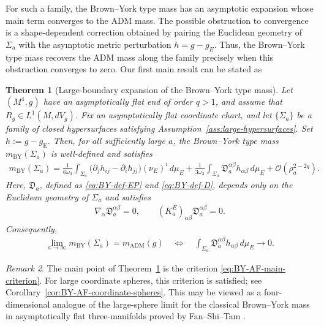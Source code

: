 \documentclass[10pt]{amsart}
\newcommand{\gE}{g_{\mathrm{E}}}
\newcommand{\ADM}{\mathrm{ADM}}
\newcommand{\BY}{\mathrm{BY}}
\theoremstyle{plain}
\newtheorem{theorem}{Theorem}[section]
\theoremstyle{remark}
\newtheorem{remark}[theorem]{Remark}
\begin{document}
	For such a family, the Brown--York type mass has an asymptotic expansion whose main term converges to the ADM mass. The possible obstruction to convergence is a shape-dependent correction obtained by pairing the Euclidean geometry of $\Sigma_a$ with the asymptotic metric perturbation $h=g-g_E$. Thus, the Brown--York type mass recovers the ADM mass along the family precisely when this obstruction converges to zero. Our first main result can be stated as
	
	\begin{theorem}[Large-boundary expansion of the Brown--York type mass]
		\label{thm:BY-AF-large-boundary}
		Let $(M^4,g)$ have an asymptotically flat end of order $q>1$, and assume that
		$R_g\in L^1(M,dV_g)$. Fix an asymptotically flat coordinate chart, and let
		$\{\Sigma_a\}$ be a family of closed hypersurfaces satisfying
		Assumption~\ref{ass:large-hypersurfaces}. Set $h:=g-\gE$. Then, for all sufficiently large $a$, the Brown--York type mass
		$m_{\BY}(\Sigma_a)$ is well-defined and satisfies
		\begin{align}\label{eq:BY-AF-main-expansion}
			m_{\BY}(\Sigma_a)
			=
			\frac{1}{6\omega_3}
			\int_{\Sigma_a}
			\bigl(
			\partial_jh_{ij}
			-
			\partial_ih_{jj}
			\bigr)(\nu_E)^i\,d\mu_E
			+
			\frac{1}{3\omega_3}\int_{\Sigma_a}
			\mathfrak D_a^{\alpha\beta}
			h_{\alpha\beta}\,d\mu_E
			+
			\mathcal O(\rho_a^{2-2q}).
		\end{align}
		Here, $\mathfrak D_a$, defined as \eqref{eq:BY-def-EP} and \eqref{eq:BY-def-D}, depends only on the Euclidean geometry of $\Sigma_a$ and satisfies
		\begin{align*}
			\nabla_\alpha\mathfrak D_a^{\alpha\beta}=0,
			\qquad
			(K_a^E)_{\alpha\beta}\mathfrak D_a^{\alpha\beta}=0.
		\end{align*}
		Consequently,
		\begin{align}\label{eq:BY-AF-main-criterion}
			\lim_{a\to\infty}m_{\BY}(\Sigma_a)
			=
			m_{\ADM}(g)
			\quad\Longleftrightarrow\quad
			\int_{\Sigma_a}
			\mathfrak D_a^{\alpha\beta}
			h_{\alpha\beta}\,d\mu_E
			\longrightarrow 0.
		\end{align}
	\end{theorem}
	
	\begin{remark}
		The main point of Theorem~\ref{thm:BY-AF-large-boundary} is the
		criterion \eqref{eq:BY-AF-main-criterion}.  For large coordinate
		spheres, this criterion is satisfied; see
		Corollary~\ref{cor:BY-AF-coordinate-spheres}.  This may be viewed as
		a four-dimensional analogue of the large-sphere limit for the
		classical Brown--York mass in asymptotically flat three-manifolds
		proved by Fan--Shi--Tam \cite{FanShiTam}.
	\end{remark}
	
\end{document}
